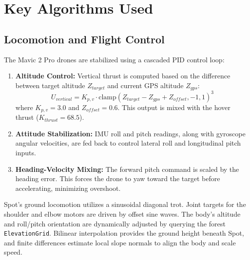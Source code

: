 \documentclass[11pt,a4paper]{article}
\begin{document}
\section{Key Algorithms Used}

\subsection{Locomotion and Flight Control}
The Mavic 2 Pro drones are stabilized using a cascaded PID control loop:
\begin{enumerate}
  \item \textbf{Altitude Control:} Vertical thrust is computed based on the difference between target altitude $Z_{target}$ and current GPS altitude $Z_{gps}$:
  \begin{equation}
    U_{vertical} = K_{p,v} \cdot \text{clamp}(Z_{target} - Z_{gps} + Z_{offset}, -1, 1)^3
  \end{equation}
  where $K_{p,v} = 3.0$ and $Z_{offset} = 0.6$. This output is mixed with the hover thrust ($K_{thrust} = 68.5$).
  \item \textbf{Attitude Stabilization:} IMU roll and pitch readings, along with gyroscope angular velocities, are fed back to control lateral roll and longitudinal pitch inputs.
  \item \textbf{Heading-Velocity Mixing:} The forward pitch command is scaled by the heading error. This forces the drone to yaw toward the target before accelerating, minimizing overshoot.
\end{enumerate}

Spot's ground locomotion utilizes a sinusoidal diagonal trot. Joint targets for the shoulder and elbow motors are driven by offset sine waves. The body's altitude and roll/pitch orientation are dynamically adjusted by querying the forest \texttt{ElevationGrid}. Bilinear interpolation provides the ground height beneath Spot, and finite differences estimate local slope normals to align the body and scale speed.
\end{document}
